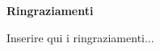 \documentclass[12pt, a4paper, oneside, openright]{book}
\theoremstyle{definition}
\numberwithin{definition}{chapter}
\theoremstyle{definition}
\numberwithin{assumption}{chapter}
\theoremstyle{remark}
\numberwithin{example}{chapter}
\theoremstyle{remark}
\numberwithin{remark}{chapter}
\theoremstyle{plain}
\numberwithin{theorem}{chapter}
\numberwithin{corollary}{chapter}
\numberwithin{lemma}{chapter}
\numberwithin{proposition}{chapter}
\newenvironment{acknowledgements}%
    {\cleardoublepage\null\vfill\begin{center}\bfseries Ringraziamenti\end{center}}%
    {\vfill\null}
\newcommand{\aibox}{$\square$~}
\newcommand{\aiboxx}{$\blacksquare$~}
\begin{document}
\tableofcontents

\begin{acknowledgements}
Inserire qui i ringraziamenti...
\end{acknowledgements}

%
\end{document}
